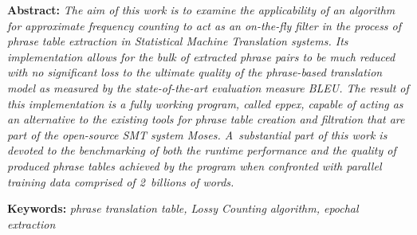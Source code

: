 \documentclass[12pt,a4paper]{report}
\let\openright=\clearpage
\begin{document}
{\textbf{Abstract:}
\emph{The aim of this work is to examine the applicability of an algorithm for
approximate frequency counting to act as an on-the-fly filter in the process
of phrase table extraction in Statistical Machine Translation systems.
Its implementation allows for the bulk of extracted phrase pairs to be much
reduced with no significant loss to the ultimate quality of the phrase-based
translation model as measured by the state-of-the-art evaluation measure BLEU.
The result of this implementation is a fully working program, called eppex,
capable of acting as an alternative to the existing tools for phrase table
creation and filtration that are part of the open-source SMT system Moses.
A~substantial part of this work is devoted to the benchmarking of both
the runtime performance and the quality of produced phrase tables achieved
by the program when confronted with parallel training data comprised of
2~billions of words.}

\textbf{Keywords:}
\emph{phrase translation table, Lossy Counting algorithm, epochal extraction}

\vss}

\newpage


\openright
\pagestyle{plain}
\setcounter{page}{1}
\tableofcontents
















\cleardoublepage
{}
{}
\end{document}
